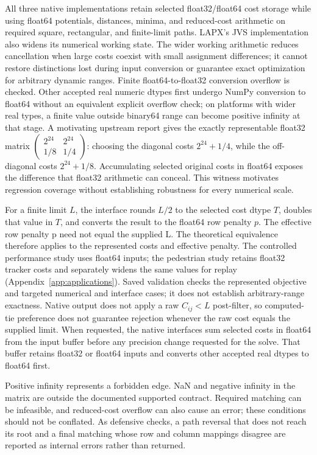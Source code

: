 \documentclass[11pt,a4paper]{article}
\begin{document}
All three native implementations retain selected float32/float64 cost storage while using float64 potentials, distances, minima, and reduced-cost arithmetic on required square, rectangular, and finite-limit paths. LAPX's JVS implementation also widens its numerical working state. The wider working arithmetic reduces cancellation when large costs coexist with small assignment differences; it cannot restore distinctions lost during input conversion or guarantee exact optimization for arbitrary dynamic ranges. Finite float64-to-float32 conversion overflow is checked. Other accepted real numeric dtypes first undergo NumPy conversion to float64 without an equivalent explicit overflow check; on platforms with wider real types, a finite value outside binary64 range can become positive infinity at that stage. A motivating upstream report \cite{lapjvprecision2026} gives the exactly representable float32 matrix \(\left(\begin{smallmatrix}2^{24}&2^{24}\\1/8&1/4\end{smallmatrix}\right)\): choosing the diagonal costs \(2^{24}+1/4\), while the off-diagonal costs \(2^{24}+1/8\). Accumulating selected original costs in float64 exposes the difference that float32 arithmetic can conceal. This witness motivates regression coverage without establishing robustness for every numerical scale.

For a finite limit \(L\), the interface rounds \(L/2\) to the selected cost dtype \(T\), doubles that value in \(T\), and converts the result to the float64 row penalty \(p\). The effective row penalty p need not equal the supplied L. The theoretical equivalence therefore applies to the represented costs and effective penalty. The controlled performance study uses float64 inputs; the pedestrian study retains float32 tracker costs and separately widens the same values for replay (Appendix~\ref{app:applications}). Saved validation checks the represented objective and targeted numerical and interface cases; it does not establish arbitrary-range exactness. Native output does not apply a raw \(C_{ij}<L\) post-filter, so computed-tie preference does not guarantee rejection whenever the raw cost equals the supplied limit. When requested, the native interfaces sum selected costs in float64 from the input buffer before any precision change requested for the solve. That buffer retains float32 or float64 inputs and converts other accepted real dtypes to float64 first.

Positive infinity represents a forbidden edge. NaN and negative infinity in the matrix are outside the documented supported contract. Required matching can be infeasible, and reduced-cost overflow can also cause an error; these conditions should not be conflated. As defensive checks, a path reversal that does not reach its root and a final matching whose row and column mappings disagree are reported as internal errors rather than returned.
\end{document}
